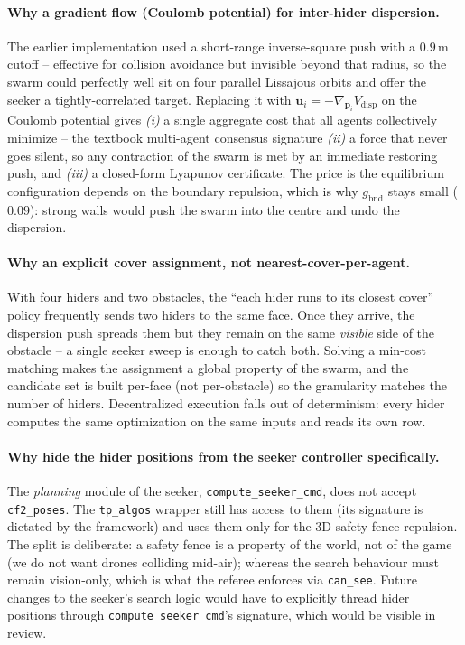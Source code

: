 \documentclass[11pt,a4paper]{article}
\newcommand{\code}[1]{\texttt{#1}}
\newcommand{\vect}[1]{\mathbf{#1}}
\begin{document}
\paragraph{Why a gradient flow (Coulomb potential) for inter-hider dispersion.}
The earlier implementation used a short-range inverse-square push with a
$0.9\,\text{m}$ cutoff -- effective for collision avoidance but invisible
beyond that radius, so the swarm could perfectly well sit on four parallel
Lissajous orbits and offer the seeker a tightly-correlated target. Replacing
it with $\vect{u}_i = -\nabla_{\vect{p}_i} V_\mathrm{disp}$ on the Coulomb
potential gives \emph{(i)} a single aggregate cost that all agents
collectively minimize -- the textbook multi-agent consensus signature
\emph{(ii)} a force that never goes silent, so any contraction of the swarm
is met by an immediate restoring push, and \emph{(iii)} a closed-form
Lyapunov certificate. The price is the equilibrium configuration depends on
the boundary repulsion, which is why $g_\mathrm{bnd}$ stays small ($0.09$):
strong walls would push the swarm into the centre and undo the dispersion.

\paragraph{Why an explicit cover assignment, not nearest-cover-per-agent.}
With four hiders and two obstacles, the ``each hider runs to its closest
cover'' policy frequently sends two hiders to the same face. Once they
arrive, the dispersion push spreads them but they remain on the same
\emph{visible} side of the obstacle -- a single seeker sweep is enough to
catch both. Solving a min-cost matching makes the assignment a global
property of the swarm, and the candidate set is built per-face (not
per-obstacle) so the granularity matches the number of hiders. Decentralized
execution falls out of determinism: every hider computes the same
optimization on the same inputs and reads its own row.

\paragraph{Why hide the hider positions from the seeker controller specifically.}
The \emph{planning} module of the seeker, \code{compute\_seeker\_cmd}, does
not accept \code{cf2\_poses}. The \code{tp\_algos} wrapper still has access to
them (its signature is dictated by the framework) and uses them only for the
3D safety-fence repulsion. The split is deliberate: a safety fence is a
property of the world, not of the game (we do not want drones colliding
mid-air); whereas the search behaviour must remain vision-only, which is what
the referee enforces via \code{can\_see}. Future changes to the seeker's
search logic would have to explicitly thread hider positions through
\code{compute\_seeker\_cmd}'s signature, which would be visible in review.
\end{document}

